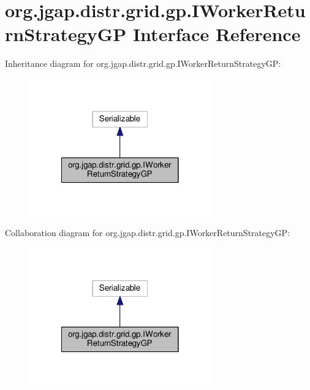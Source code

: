 \hypertarget{interfaceorg_1_1jgap_1_1distr_1_1grid_1_1gp_1_1_i_worker_return_strategy_g_p}{\section{org.\-jgap.\-distr.\-grid.\-gp.\-I\-Worker\-Return\-Strategy\-G\-P Interface Reference}
\label{interfaceorg_1_1jgap_1_1distr_1_1grid_1_1gp_1_1_i_worker_return_strategy_g_p}
}


Inheritance diagram for org.\-jgap.\-distr.\-grid.\-gp.\-I\-Worker\-Return\-Strategy\-G\-P\-:
\nopagebreak
\begin{figure}[H]
\begin{center}
\leavevmode
\includegraphics[width=222pt]{interfaceorg_1_1jgap_1_1distr_1_1grid_1_1gp_1_1_i_worker_return_strategy_g_p__inherit__graph}
\end{center}
\end{figure}


Collaboration diagram for org.\-jgap.\-distr.\-grid.\-gp.\-I\-Worker\-Return\-Strategy\-G\-P\-:
\nopagebreak
\begin{figure}[H]
\begin{center}
\leavevmode
\includegraphics[width=222pt]{interfaceorg_1_1jgap_1_1distr_1_1grid_1_1gp_1_1_i_worker_return_strategy_g_p__coll__graph}
\end{center}
\end{figure}
